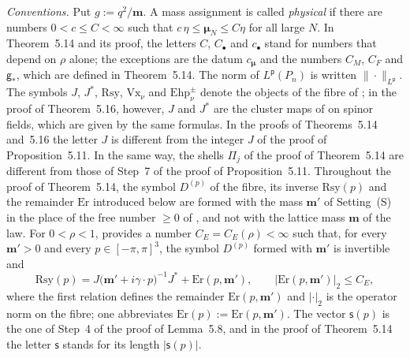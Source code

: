 \documentclass[11pt]{amsart}
\theoremstyle{definition}
\begin{document}
\emph{Conventions.}
Put $g:=q^2/\mathbf m$.
A mass assignment is called \emph{physical} if there are numbers $0<c\le C<\infty$ such that $c\,\eta\le\boldsymbol\mu_N\le C\eta$ for all large $N$.
In Theorem~5.14 and its proof, the letters $C$, $C_\bullet$ and $c_\bullet$ stand for numbers that depend on $\rho$ alone;
the exceptions are the datum $c_{\boldsymbol\mu}$ and the numbers $C_M$, $C_F$ and $\mathsf g_*$, which are defined in Theorem~5.14.
The norm of $L^{\mathsf p}(P_n)$ is written $\|\cdot\|_{L^{\mathsf p}}$.
The symbols $J$, $J^*$, $\mathrm{Rsy}$, $\mathrm{Vx}_\nu$ and $\mathrm{Ehp}^\pm_\nu$ denote the objects of the fibre of \cite[Section~G5.6.0]{QEDIII};
in the proof of Theorem~5.16, however, $J$ and $J^*$ are the cluster maps of \cite[(I.3.1)]{QEDIII} on spinor fields, which are given by the same formulas.
In the proofs of Theorems~5.14 and~5.16 the letter $J$ is different from the integer $J$ of the proof of Proposition~5.11.
In the same way, the shells $\Pi_j$ of the proof of Theorem~5.14 are different from those of Step~7 of the proof of Proposition~5.11.
Throughout the proof of Theorem~5.14, the symbol $D^{(p)}$ of the fibre, its inverse $\mathrm{Rsy}(p)$ and the remainder $\mathrm{Er}$ introduced below are formed with the mass $\mathbf m'$ of Setting~(S) in the place of the free number $\ge0$ of \cite[Section~G5.6.0]{QEDIII}, and not with the lattice mass $\mathbf m$ of the law.
For $0<\rho<1$, \cite[Proposition~37.1\,(f)]{QEDIII} provides a number $C_E=C_E(\rho)<\infty$ such that, for every $\mathbf m'>0$ and every $p\in[-\pi,\pi]^3$, the symbol $D^{(p)}$ formed with $\mathbf m'$ is invertible and
\begin{equation*}
\mathrm{Rsy}(p)=J\bigl(\mathbf m'+i\gamma\cdot p\bigr)^{-1}J^*+\mathrm{Er}(p,\mathbf m'),\qquad\bigl|\mathrm{Er}(p,\mathbf m')\bigr|_2\le C_E,
\end{equation*}
where the first relation defines the remainder $\mathrm{Er}(p,\mathbf m')$ and $|\cdot|_2$ is the operator norm on the fibre;
one abbreviates $\mathrm{Er}(p):=\mathrm{Er}(p,\mathbf m')$.
The vector $\mathsf s(p)$ is the one of Step~4 of the proof of Lemma~5.8, and in the proof of Theorem~5.14 the letter $\mathsf s$ stands for its length $|\mathsf s(p)|$.
\end{document}
